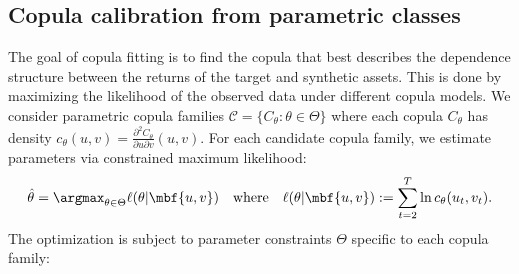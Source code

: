 \subsection{Copula calibration from parametric classes}

The goal of copula fitting is to find the copula that best describes the dependence structure between the returns of the target and synthetic assets. This is done by maximizing the likelihood of the observed data under different copula models. 
We consider parametric copula families $\mathcal{C} = \{C_\theta : \theta \in \Theta\}$ where each copula $C_\theta$ has density
$
c_\theta(u,v) = \frac{\partial^2 C_\theta}{\partial u \partial v}(u,v)
.
$
For each candidate copula family, we estimate parameters via constrained maximum likelihood:
%
\begin{equation} \label{eq:mle}
\hat{\theta} = \argmax_{\theta \in \Theta} \ell(\theta | \mbf {u,v}) \quad \text{where} \quad 
\ell(\theta| \mbf {u,v}) := \sum_{t=2}^T \ln c_\theta(u_t, v_t)
.
\end{equation}
%
The optimization is subject to parameter constraints $\Theta$ specific to each copula family:

